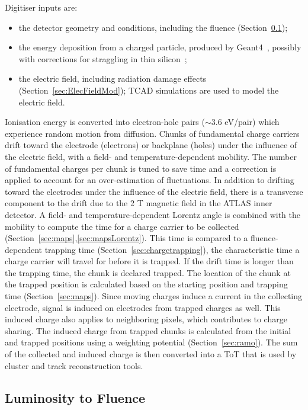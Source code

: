 Digitiser inputs are:
\begin{itemize}

\item the detector geometry and conditions, including the fluence (Section~\ref{sec:fluence});
\item the  energy deposition from a charged particle, produced by Geant4~\cite{Agostinelli:2002hh}, possibly with corrections for straggling in thin silicon~\cite{Bichsel:1988if};
\item the electric field, including radiation damage effects (Section~\ref{sec:ElecFieldMod}); TCAD simulations are used to model the electric field.
 \end{itemize}
 
   Ionisation energy is converted into electron-hole pairs ($\sim 3.6$ eV/pair) which experience random motion from diffusion.  Chunks of fundamental charge carriers drift toward the electrode (electrons) or backplane (holes) under the influence of the electric field, with a field- and temperature-dependent mobility.  The number of fundamental charges per chunk is tuned to save time and a correction is applied to account for an over-estimation of fluctuations.  In addition to drifting toward the electrodes under the influence of the electric field, there is a transverse component to the drift due to the 2 T magnetic field in the ATLAS inner detector.  A field- and temperature-dependent Lorentz angle is combined with the mobility to compute the time for a charge carrier to be collected (Section~\ref{sec:maps},\ref{sec:mapsLorentz}).  This time is compared to a fluence-dependent trapping time (Section~\ref{sec:chargetrapping}), the characteristic time a charge carrier will travel for before it is trapped.  If the drift time is longer than the trapping time, the chunk is declared trapped.  The location of the chunk at the trapped position is calculated based on the starting position and trapping time (Section~\ref{sec:maps}).  Since moving charges induce a current in the collecting electrode, signal is induced on electrodes from trapped charges as well.  This induced charge also applies to neighboring pixels, which contributes to charge sharing.  The induced charge from trapped chunks is calculated from the initial and trapped positions using a weighting potential (Section~\ref{sec:ramo}).  The sum of the collected and induced charge is then converted into a ToT that is used by cluster and track reconstruction tools.



\subsection{Luminosity to Fluence}
\label{sec:fluence}



